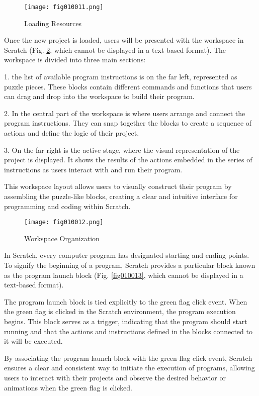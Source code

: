 \begin{figure}[H]
   \centering
   \texttt{[image: fig010011.png]}
   \caption{Loading Resources}
\label{fig010011}
\end{figure}

Once the new project is loaded, users will be presented with the workspace in Scratch (Fig. \ref{fig010012}, which cannot be displayed in a text-based format). The workspace is divided into three main sections:

1. the list of available program instructions is on the far left, represented as puzzle pieces. These blocks contain different commands and functions that users can drag and drop into the workspace to build their program.

2. In the central part of the workspace is where users arrange and connect the program instructions. They can snap together the blocks to create a sequence of actions and define the logic of their project.

3. On the far right is the active stage, where the visual representation of the project is displayed. It shows the results of the actions embedded in the series of instructions as users interact with and run their program.

This workspace layout allows users to visually construct their program by assembling the puzzle-like blocks, creating a clear and intuitive interface for programming and coding within Scratch.

\begin{figure}[H]
   \centering
   \texttt{[image: fig010012.png]}
   \caption{Workspace Organization}
\label{fig010012}
\end{figure}

In Scratch, every computer program has designated starting and ending points. To signify the beginning of a program, Scratch provides a particular block known as the program launch block (Fig. \ref{fig010013}, which cannot be displayed in a text-based format).

The program launch block is tied explicitly to the green flag click event. When the green flag is clicked in the Scratch environment, the program execution begins. This block serves as a trigger, indicating that the program should start running and that the actions and instructions defined in the blocks connected to it will be executed.

By associating the program launch block with the green flag click event, Scratch ensures a clear and consistent way to initiate the execution of programs, allowing users to interact with their projects and observe the desired behavior or animations when the green flag is clicked.

